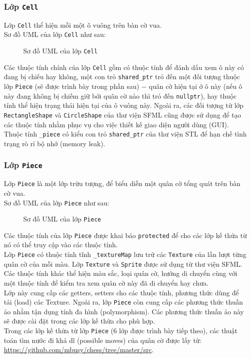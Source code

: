 \subsubsection{Lớp \lstinline{Cell}}
Lớp \lstinline{Cell} thể hiện mỗi một ô vuông trên bàn cờ vua.\\
Sơ đồ UML của lớp \lstinline{Cell} như sau:
\begin{figure}[H]
\caption{Sơ đồ UML của lớp \lstinline{Cell}}
\end{figure}
Các thuộc tính chính của lớp \lstinline{Cell} gồm có thuộc tính để đánh dấu xem ô này có đang bị chiếu hay không, một con trỏ \lstinline{shared_ptr} trỏ đến một đối tượng thuộc lớp \lstinline{Piece} (sẽ được trình bày trong phần sau) $-$ quân cờ hiện tại ở ô này (nếu ô này đang không bị chiếm giữ bởi quân cờ nào  thì trỏ đến \lstinline{nullptr}), hay thuộc tính thể hiện trạng thái hiện tại của ô vuông này. Ngoài ra, các đối tượng từ lớp \lstinline{RectangleShape} và \lstinline{CircleShape} của thư viện SFML cũng được sử dụng để tạo các thuộc tính nhằm phục vụ cho việc thiết kế giao diện người dùng (GUI).\\
Thuộc tính \lstinline{_piece} có kiểu con trỏ \lstinline{shared_ptr} của thư viện STL để hạn chế tình trạng rò rỉ bộ nhớ (memory leak).
\subsubsection{Lớp \lstinline{Piece}}
Lớp \lstinline{Piece} là một lớp trừu tượng, để biểu diễn một quân cờ tổng quát trên bàn cờ vua.\\
Sơ đồ UML của lớp \lstinline{Piece} như sau:
\begin{figure}[H]
\caption{Sơ đồ UML của lớp \lstinline{Piece}}
\end{figure}
Các thuộc tính của lớp \lstinline{Piece} được khai báo \lstinline{protected} để cho các lớp kế thừa từ nó có thể truy cập vào các thuộc tính.\\
Lớp \lstinline{Piece} có thuộc tính tĩnh \lstinline{_textureMap} lưu trữ các \lstinline{Texture} của lần lượt từng quân cờ của mỗi màu. Lớp \lstinline{Texture} và \lstinline{Sprite} được sử dụng từ thư viện SFML.\\
Các thuộc tính khác thể hiện màu sắc, loại quân cờ, hướng di chuyển cùng với một thuộc tính để kiểm tra xem quân cờ này đã di chuyển hay chưa.\\
Lớp này cung cấp các getters, setters cho các thuộc tính, phương thức dùng để tải (load) các Texture. Ngoài ra, lớp \lstinline{Piece} còn cung cấp các phương thức thuần ảo nhằm tận dụng tính đa hình (polymorphism). Các phương thức thuần ảo này sẽ được cài đặt trong các lớp kế thừa cho phù hợp.\\
Trong các lớp kế thừa từ lớp \lstinline{Piece} (6 lớp được trình bày tiếp theo), các thuật toán tìm nước đi khả dĩ (possible moves) của quân cờ được lấy từ: \url{https://github.com/mbusy/chess/tree/master/src}.
